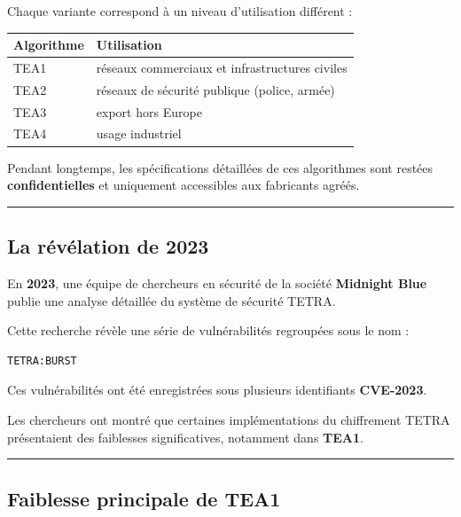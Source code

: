 \documentclass[
  french,
]{article}
\begin{document}
Chaque variante correspond à un niveau d'utilisation différent :

\begin{longtable}[]{@{}ll@{}}
\toprule\noalign{}
Algorithme & Utilisation \\
\midrule\noalign{}
\endhead
\bottomrule\noalign{}
\endlastfoot
TEA1 & réseaux commerciaux et infrastructures civiles \\
TEA2 & réseaux de sécurité publique (police, armée) \\
TEA3 & export hors Europe \\
TEA4 & usage industriel \\
\end{longtable}

Pendant longtemps, les spécifications détaillées de ces algorithmes sont
restées \textbf{confidentielles} et uniquement accessibles aux
fabricants agréés.

\begin{center}\rule{0.5\linewidth}{0.5pt}\end{center}

\subsection{La révélation de 2023}\label{la-ruxe9vuxe9lation-de-2023}

En \textbf{2023}, une équipe de chercheurs en sécurité de la société
\textbf{Midnight Blue} publie une analyse détaillée du système de
sécurité TETRA.

Cette recherche révèle une série de vulnérabilités regroupées sous le
nom :

\begin{verbatim}
TETRA:BURST
\end{verbatim}

Ces vulnérabilités ont été enregistrées sous plusieurs identifiants
\textbf{CVE-2023}.

Les chercheurs ont montré que certaines implémentations du chiffrement
TETRA présentaient des faiblesses significatives, notamment dans
\textbf{TEA1}.

\begin{center}\rule{0.5\linewidth}{0.5pt}\end{center}

\subsection{Faiblesse principale de
TEA1}\label{faiblesse-principale-de-tea1}
\end{document}
